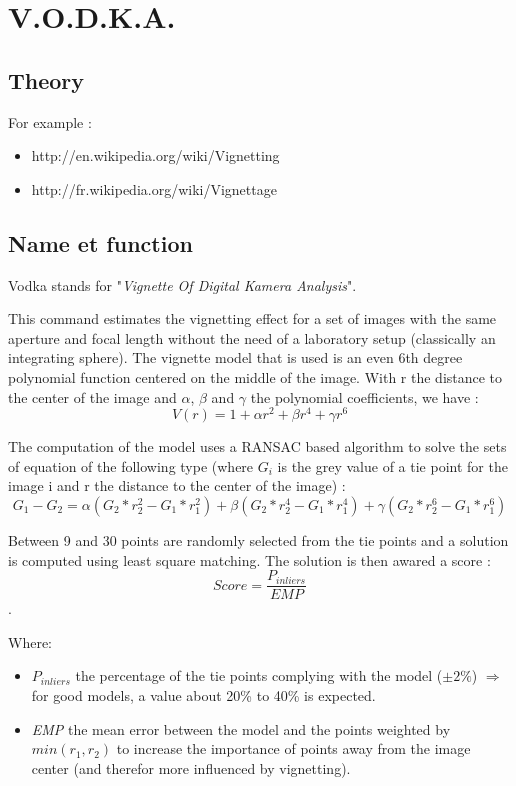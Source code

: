 
\section{V.O.D.K.A.}
\label{V.O.D.K.A.}


\subsection{Theory}

For example :


\begin{itemize}
   \item http://en.wikipedia.org/wiki/Vignetting
   \item http://fr.wikipedia.org/wiki/Vignettage
\end{itemize}



\subsection{Name et function}
Vodka stands for "\textit{Vignette Of Digital Kamera Analysis}".


This command estimates the vignetting effect for a set of images with the same aperture and focal length without the need of a laboratory setup (classically an integrating sphere). The vignette model that is used is an even 6th degree polynomial function centered on the middle of the image. With r the distance to the center of the image and $\alpha$, $\beta$ and $\gamma$ the polynomial coefficients, we have : \[V(r)=1+ \alpha r^2 + \beta r^4 + \gamma r^6\]


The computation of the model uses a RANSAC based algorithm to solve the sets of equation of the following type (where $G_{i}$ is the grey value of a tie point for the image i and r the distance to the center of the image) : \[ G_{1}-G_{2}=\alpha(G_{2}*r_{2}^2-G_{1}*r_{1}^2)+\beta(G_{2}*r_{2}^4-G_{1}*r_{1}^4)+\gamma(G_{2}*r_{2}^6-G_{1}*r_{1}^6) \] 

Between 9 and 30 points are randomly selected from the tie points and a solution is computed using least square matching. The solution is then awared a score : \[Score=\frac{P_{inliers}}{EMP}\].

Where:
\begin{itemize}
\item \textit{$P_{inliers}$} the percentage of the tie points complying with the model ($\pm 2\%$) $\Rightarrow$ for good models, a value about 20\% to 40\% is expected.

\item \textit{EMP} the mean error between the model and the points weighted by $min(r_{1},r_{2})$ to increase the importance of points away from the image center (and therefor more influenced by vignetting).
\end{itemize}


